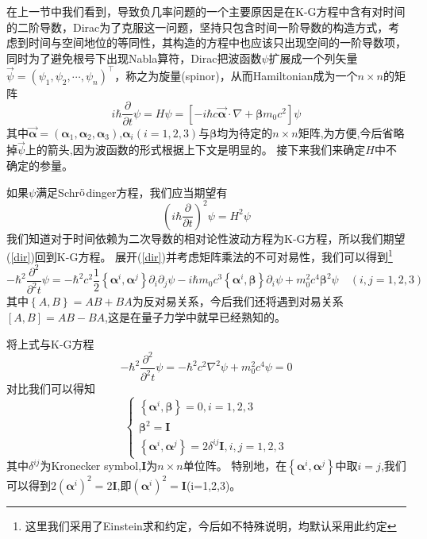 在上一节中我们看到，导致负几率问题的一个主要原因是在K-G方程中含有对时间的二阶导数，Dirac为了克服这一问题，坚持只包含时间一阶导数的构造方式，考虑到时间与空间地位的等同性，其构造的方程中也应该只出现空间的一阶导数项，同时为了避免根号下出现Nabla算符，Dirac把波函数$\psi$扩展成一个列矢量$\vec{\psi}=(\psi_{1},\psi_{2},\cdots,\psi_{n})^{\top}$，称之为旋量(spinor)，从而Hamiltonian成为一个$n\times n$的矩阵
\begin{equation}
\label{Dirac}
    i\hbar \frac{\partial}{\partial t}\psi=H\psi=\left[-i\hbar c \vec{\pmb{\alpha}}\cdot \nabla +\pmb{\beta}m_{0}c^{2}\right]\psi
\end{equation}
其中$\vec{\pmb{\alpha}}=(\pmb{\alpha}_{1},\pmb{\alpha}_{2},\pmb{\alpha}_{3})$,$\pmb{\alpha}_{i}(i=1,2,3)$与$\pmb{\beta}$均为待定的$n\times n$矩阵,为方便,今后省略掉$\vec{\psi}$上的箭头,因为波函数的形式根据上下文是明显的。
接下来我们来确定$H$中不确定的参量。

如果$\psi$满足Schr$\ddot{\rm{o}}$dinger方程，我们应当期望有
\begin{equation}
\label{dir}
\left(i\hbar \frac{\partial}{\partial t}\right)^{2}\psi=H^{2}\psi
\end{equation}
我们知道对于时间依赖为二次导数的相对论性波动方程为K-G方程，所以我们期望(\ref{dir})回到K-G方程。
展开(\ref{dir})并考虑矩阵乘法的不可对易性，我们可以得到\footnote{这里我们采用了Einstein求和约定，今后如不特殊说明，均默认采用此约定}
\begin{equation}
    -\hbar^{2}\frac{\partial^{2}}{\partial^{2} t}\psi=-\hbar^{2}c^{2}\frac{1}{2}\left\{\pmb{\alpha}^{i},\pmb{\alpha}^{j}\right\}\partial_{i}\partial_{j}\psi-i\hbar m_{0}c^{3}\left\{\pmb{\alpha}^{i},\pmb{\beta}\right\}\partial_{i}\psi+m^{2}_{0}c^{4}\pmb{\beta}^{2}\psi \quad (i,j=1,2,3)
\end{equation}
其中$\left\{A,B\right\}=AB+BA$为反对易关系，今后我们还将遇到对易关系$\left[A,B\right]=AB-BA$,这是在量子力学中就早已经熟知的。

将上式与K-G方程
\begin{equation}
-\hbar^{2}\frac{\partial^{2}}{\partial^{2} t}\psi=-\hbar^{2}c^{2}\nabla^{2}\psi+m^2_{0}c^{4}\psi=0
\end{equation}
对比我们可以得知
\begin{equation}
\label{requsetofDirac}
\left\{
        \begin{array}{lll}
            \left\{\pmb{\alpha}^{i},\pmb{\beta}\right\}=0,i=1,2,3 \\
            \pmb{\beta}^{2}=\pmb{I}  \\
            \left\{\pmb{\alpha}^{i},\pmb{\alpha}^{j}\right\}=2\delta^{ij}\pmb{I}, i,j=1,2,3
        \end{array}
    \right.
\end{equation}
其中$\delta^{ij}$为Kronecker symbol,$\pmb{I}$为$n\times n$单位阵。
特别地，在$\left\{\pmb{\alpha}^{i},\pmb{\alpha}^{j}\right\}$中取$i=j$,我们可以得到$2(\pmb{\alpha}^{i})^{2}=2\pmb{I}$,即$(\pmb{\alpha}^{i})^{2}=\pmb{I}$(i=1,2,3)。

